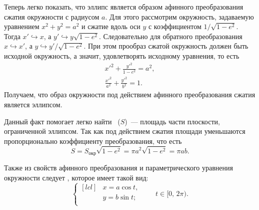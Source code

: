 Теперь легко показать, что эллипс является образом афинного преобразования сжатия окружности с радиусом $a$. Для этого рассмотрим окружность, задаваемую уравнением $x^2 + y^2 = a^2$ и сжатие вдоль оси $y$ с коэффициентом $1/\sqrt{1 - e^2}$. Тогда $x' \hookrightarrow x$, а $y' \hookrightarrow y \sqrt{1-e^2}$. Следовательно для обратного преобразования $x \hookrightarrow x'$, а $y \hookrightarrow y'/\sqrt{1 - e^2}$. При этом прообраз сжатой окружность должен быть исходной окружность, а значит, удовлетворять исходному уравнения, то есть
\begin{gather*}
	x'^2 + \frac{y'^2}{1 - e^2} = a^2,\\
	\frac{x'^2}{a^2} + \frac{y'^2}{b^2} = 1.
\end{gather*}
Получаем, что образ окружности под действием афинного преобразования сжатия является эллипсом.

Данный факт помогает легко найти ~($S$)~--- площадь части
плоскости, ограниченной эллипсом. Так как под действием сжатия площади уменьшаются пропорционально коэффициенту преобразования, что есть
\begin{equation}
	S = S_\text{окр} \sqrt{1 - e^2} = \pi a^2 \sqrt{1 - e^2} = \pi a b.
\end{equation}

Также из свойств афинного преобразования и параметрического уравнения окружности следует , которое имеет такой вид:
\begin{equation}
	\left\{
	\begin{aligned}[lcl]
		&x=a\cos t,\\
		&y=b\sin t;\\
	\end{aligned}
	\right. \quad\quad t \in [0, \, 2\pi).
\end{equation}

